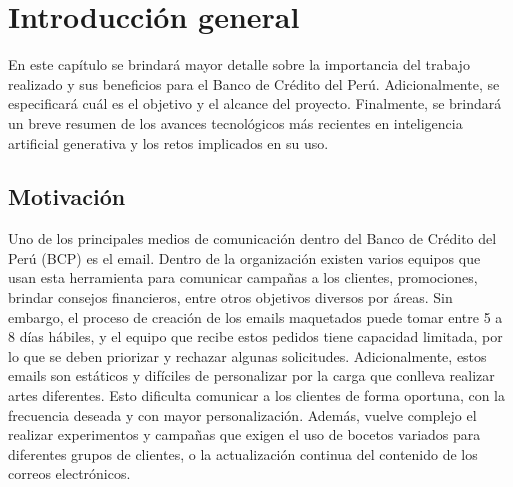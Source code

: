 
\chapter{Introducción general} %

\label{Chapter1} %
\label{IntroGeneral}


\newcommand{\keyword}[1]{\textbf{#1}}
\newcommand{\tabhead}[1]{\textbf{#1}}
\newcommand{\code}[1]{\texttt{#1}}
\newcommand{\file}[1]{\texttt{\bfseries#1}}
\newcommand{\option}[1]{\texttt{\itshape#1}}
\newcommand{\grados}{$^{\circ}$}



En este capítulo se brindará mayor detalle sobre la importancia del trabajo realizado y sus beneficios para el Banco de Crédito del Perú. Adicionalmente, se especificará cuál es el objetivo y el alcance del proyecto. Finalmente, se brindará un breve resumen de los avances tecnológicos más recientes en inteligencia artificial generativa y los retos implicados en su uso.

\section{Motivación}

Uno de los principales medios de comunicación dentro del Banco de Crédito del Perú (BCP) es el email. Dentro de la organización existen varios equipos que usan esta herramienta para comunicar campañas a los clientes, promociones, brindar consejos financieros, entre otros objetivos diversos por áreas. Sin embargo, el proceso de creación de los emails maquetados puede tomar entre 5 a 8 días hábiles, y el equipo que recibe estos pedidos tiene capacidad limitada, por lo que se deben priorizar y rechazar algunas solicitudes. Adicionalmente, estos emails son estáticos y difíciles de personalizar por la carga que conlleva realizar artes diferentes. Esto dificulta comunicar a los clientes de forma oportuna, con la frecuencia deseada y con mayor personalización. Además, vuelve complejo el realizar experimentos y campañas que exigen el uso de bocetos variados para diferentes grupos de clientes, o la actualización continua del contenido de los correos electrónicos. 

